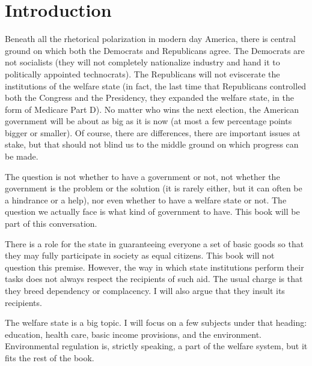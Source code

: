 \chapter{Introduction}

Beneath all the rhetorical polarization in modern day America, there is central
ground on which both the Democrats and Republicans agree. The Democrats are not
socialists (they will not completely nationalize industry and hand it to
politically appointed technocrats). The Republicans will not eviscerate the
institutions of the welfare state (in fact, the last time that Republicans
controlled both the Congress and the Presidency, they expanded the welfare
state, in the form of Medicare Part D). No matter who wins the next election,
the American government will be about as big as it is now (at most a few
percentage points bigger or smaller). Of course, there are differences, there
are important issues at stake, but that should not blind us to the middle
ground on which progress can be made.

The question is not whether to have a government or not, not whether the
government is the problem or the solution (it is rarely either, but it can
often be a hindrance or a help), nor even whether to have a welfare state or
not. The question we actually face is what kind of government to have. This
book will be part of this conversation.

There is a role for the state in guaranteeing everyone a set of basic goods so
that they may fully participate in society as equal citizens. This book will
not question this premise. However, the way in which state institutions perform
their tasks does not always respect the recipients of such aid. The usual
charge is that they breed dependency or complacency. I will also argue that
they insult its recipients.

\bigskip
\bigskip

The welfare state is a big topic. I will focus on a few subjects under that
heading: education, health care, basic income provisions, and the environment.
Environmental regulation is, strictly speaking, a part of the welfare system,
but it fits the rest of the book.

